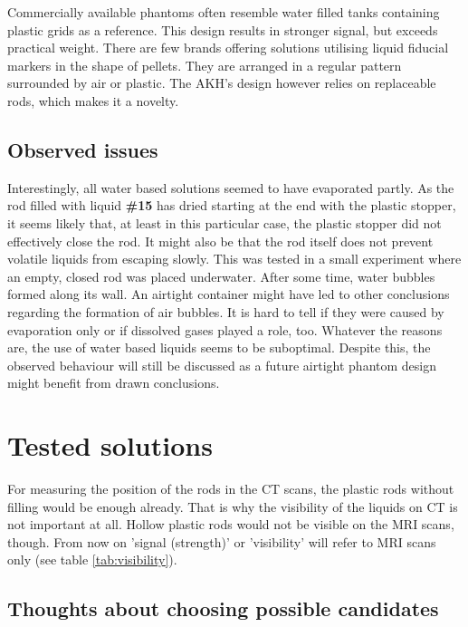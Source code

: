 Commercially available phantoms often resemble water filled tanks containing plastic grids as a reference.
This design results in stronger signal, but exceeds practical weight.
There are few brands offering solutions utilising liquid fiducial markers in the shape of pellets.
They are arranged in a regular pattern surrounded by air or plastic.
The AKH's design however relies on replaceable rods, which makes it a novelty.

\subsection{Observed issues}

Interestingly, all water based solutions seemed to have evaporated partly.
As the rod filled with liquid \textbf{\#15} has dried starting at the end with the plastic stopper, it seems likely that, at least in this particular case, the plastic stopper did not effectively close the rod.
It might also be that the rod itself does not prevent volatile liquids from escaping slowly.
This was tested in a small experiment where an empty, closed rod was placed underwater.
After some time, water bubbles formed along its wall.
An airtight container might have led to other conclusions regarding the formation of air bubbles.
It is hard to tell if they were caused by evaporation only or if dissolved gases played a role, too.
Whatever the reasons are, the use of water based liquids seems to be suboptimal.
Despite this, the observed behaviour will still be discussed as a future airtight phantom design might benefit from drawn conclusions.

\section{Tested solutions}

For measuring the position of the rods in the CT scans, the plastic rods without filling would be enough already.
That is why the visibility of the liquids on CT is not important at all.
Hollow plastic rods would not be visible on the MRI scans, though.
From now on 'signal (strength)' or 'visibility' will refer to MRI scans only (see table \ref{tab:visibility}).

\subsection{Thoughts about choosing possible candidates}

